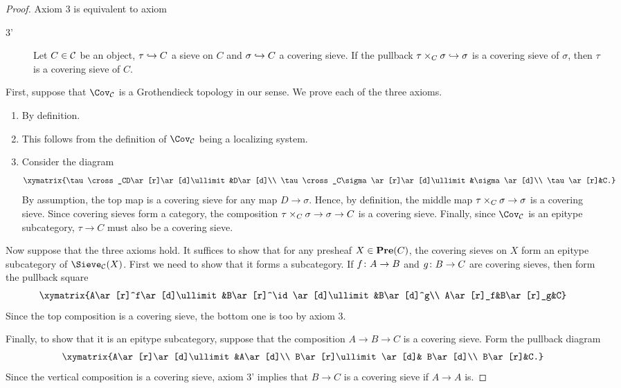 \documentclass[10pt]{amsart}
\begin{document}
\begin{proof}

Axiom 3 is equivalent to axiom \begin{description}\item[3'] Let $C\in\mathcal{C}$ be an object, $\tau\hookrightarrow C$ a sieve on $C$ and $\sigma\hookrightarrow C$ a
covering sieve.  If the pullback $\tau\times_C\sigma\hookrightarrow\sigma$ is a covering sieve of $\sigma$, then $\tau$ is a covering sieve of $C$.\end{description}

First, suppose that $\Cov_\mcC$ is a Grothendieck topology in our sense.  We prove each of the three axioms.

\begin{enumerate}

\item By definition.

\item This follows from the definition of $\Cov_\mcC$ being a localizing system.

\item Consider the diagram $$\xymatrix{\tau\cross_CD\ar[r]\ar[d]\ullimit&D\ar[d]\\ \tau\cross_C\sigma\ar[r]\ar[d]\ullimit&\sigma\ar[d]\\ \tau\ar[r]&C.}$$  By assumption, the top map is a covering sieve for any map $D\to\sigma$.  Hence, by definition, the middle map $\tau\times_C\sigma\rightarrow\sigma$ is a covering sieve.  Since covering sieves form a category, the composition $\tau\times_C\sigma\rightarrow\sigma\rightarrow C$ is a covering sieve.  Finally, since $\Cov_\mcC$ is an epitype subcategory, $\tau\to C$ must also be a covering sieve.

\end{enumerate}

Now suppose that the three axioms hold.  It suffices to show that for any presheaf $X\in{\bf Pre}(C)$, the covering sieves on $X$ form an epitype subcategory of $\Sieve_\mcC(X)$.  First we need to show that it forms a subcategory.  If $f\colon A\rightarrow B$ and $g\colon B\rightarrow C$ are covering sieves, then form the pullback square $$\xymatrix{A\ar[r]^f\ar[d]\ullimit&B\ar[r]^\id\ar[d]\ullimit&B\ar[d]^g\\ A\ar[r]_f&B\ar[r]_g&C}$$  Since the top composition is a covering sieve, the bottom one is too by axiom 3.  

Finally, to show that it is an epitype subcategory, suppose that the composition $A\to B\to C$ is a covering sieve.  Form the pullback diagram $$\xymatrix{A\ar[r]\ar[d]\ullimit&A\ar[d]\\ B\ar[r]\ullimit\ar[d]& B\ar[d]\\ B\ar[r]&C.}$$  Since the vertical composition is a covering sieve, axiom 3' implies that $B\to C$ is a covering sieve if $A\to A$ is.

\end{proof}
\end{document}
